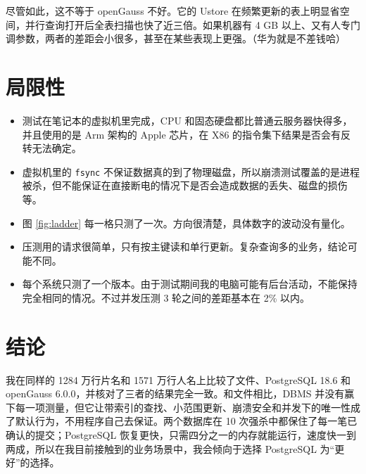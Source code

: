 \documentclass[UTF8,a4paper,zihao=5,fontset=none]{ctexart}
\newcommand{\code}[1]{\texttt{#1}}
\begin{document}
尽管如此，这不等于 openGauss 不好。它的 Ustore 在频繁更新的表上明显省空间，并行查询打开后全表扫描也快了近三倍。如果机器有 4 GB 以上、又有人专门调参数，两者的差距会小很多，甚至在某些表现上更强。（华为就是不差钱哈）

\section{局限性}\label{sec:threats}

\begin{itemize}
  \item 测试在笔记本的虚拟机里完成，CPU 和固态硬盘都比普通云服务器快得多，并且使用的是 Arm 架构的 Apple 芯片，在 X86 的指令集下结果是否会有反转无法确定。
  \item 虚拟机里的 \code{fsync} 不保证数据真的到了物理磁盘，所以崩溃测试覆盖的是进程被杀，但不能保证在直接断电的情况下是否会造成数据的丢失、磁盘的损伤等。
  \item 图 \ref{fig:ladder} 每一格只测了一次。方向很清楚，具体数字的波动没有量化。
  \item 压测用的请求很简单，只有按主键读和单行更新。复杂查询多的业务，结论可能不同。
  \item 每个系统只测了一个版本。由于测试期间我的电脑可能有后台活动，不能保持完全相同的情况。不过并发压测 3 轮之间的差距基本在 2\% 以内。
\end{itemize}

\section{结论}\label{sec:conclusion}

我在同样的 1284 万行片名和 1571 万行人名上比较了文件、PostgreSQL 18.6 和 openGauss 6.0.0，并核对了三者的结果完全一致。和文件相比，DBMS 并没有赢下每一项测量，但它让带索引的查找、小范围更新、崩溃安全和并发下的唯一性成了默认行为，不用程序自己去保证。两个数据库在 10 次强杀中都保住了每一笔已确认的提交；PostgreSQL 恢复更快，只需四分之一的内存就能运行，速度快一到两成，所以在我目前接触到的业务场景中，我会倾向于选择 PostgreSQL 为“更好”的选择。
\end{document}
